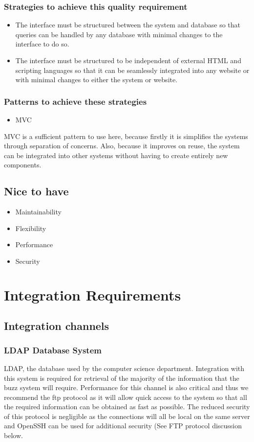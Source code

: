 \documentclass[a4paper,12pt]{report}
\begin{document}
 \subsubsection{Strategies to achieve this quality requirement}
 \begin{itemize}
 \item The interface must be structured between the system and database so that queries can be handled by any database with minimal changes to the interface to do so.
 \item The interface must be structured to be independent of external HTML and scripting languages so that it can be seamlessly integrated into any website or with minimal changes to either the system or website. 
 \end{itemize}
 \subsubsection{Patterns to achieve these strategies}
 \begin{itemize}
 \item MVC
 \end{itemize}
MVC is a sufficient pattern to use here, because firstly it is simplifies the systems through separation of concerns. Also, because it improves on reuse, the system can be integrated into other systems without having to create entirely new components.

\subsection{Nice to have}
\begin{itemize}
	\item Maintainability
	\item Flexibility
	\item Performance
	\item Security
\end{itemize}

\newpage
	\section{Integration Requirements} 
	\subsection{Integration channels}
	\subsubsection{LDAP Database System}
	LDAP, the database used by the computer science department. Integration with this system is required for retrieval of the majority of the information that the buzz system will require. Performance for this channel is also critical and thus we 				recommend the ftp protocol as it will allow quick access to the system so that all the 			required information can be obtained as fast as possible. The reduced security of this protocol is negligible as the connections will all be local on the same server and OpenSSH can be used for additional security (See FTP protocol discussion below.
\end{document}
